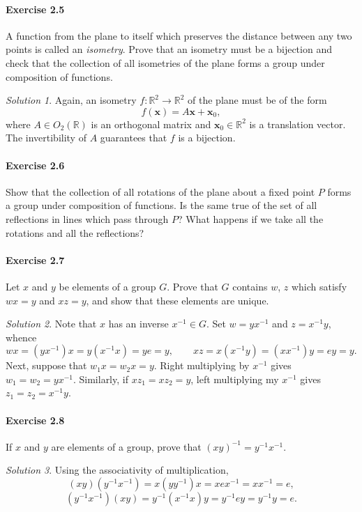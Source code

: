 \documentclass[11pt]{report}
\def\R{\mathbb{R}}
\renewcommand\vec\boldsymbol
\def\vx{\vec{x}}
\theoremstyle{remark}
\newtheorem*{solution}{Solution}
\begin{document}
    \paragraph{Exercise 2.5} A function from the plane to itself which preserves the
    distance between any two points is called an \textit{isometry}. Prove that an
    isometry must be a bijection and check that the collection of all isometries of
    the plane forms a group under composition of functions.
    \begin{solution}
        Again, an isometry $f\colon \R^2 \to \R^2$ of the plane must be of the form
        \[
            f(\vx) = A\vx + \vx_0,
        \] where $A \in O_2(\R)$ is an orthogonal matrix and $\vx_0 \in \R^2$ is a
        translation vector. The invertibility of $A$ guarantees that $f$ is a
        bijection.
    \end{solution}
    
    \paragraph{Exercise 2.6} Show that the collection of all rotations of the plane
    about a fixed point $P$ forms a group under composition of functions. Is the
    same true of the set of all reflections in lines which pass through $P$? What
    happens if we take all the rotations and all the reflections?

    \paragraph{Exercise 2.7} Let $x$ and $y$ be elements of a group $G$. Prove that
    $G$ contains $w$, $z$ which satisfy $wx = y$ and $xz = y$, and show that these
    elements are unique.
    \begin{solution}
        Note that $x$ has an inverse $x^{-1} \in G$. Set $w = yx^{-1}$ and $z =
        x^{-1}y$, whence \[
            wx = (yx^{-1})x = y(x^{-1}x) = ye = y, \qquad
            xz = x(x^{-1}y) = (xx^{-1})y = ey = y.
        \] Next, suppose that $w_1x = w_2x = y$. Right multiplying by $x^{-1}$ gives
        $w_1 = w_2 = yx^{-1}$. Similarly, if $xz_1 = xz_2 = y$, left multiplying my
        $x^{-1}$ gives $z_1 = z_2 = x^{-1}y$.
    \end{solution}

    \paragraph{Exercise 2.8} If $x$ and $y$ are elements of a group, prove that
    $(xy)^{-1} = y^{-1}x^{-1}$.
    \begin{solution}
        Using the associativity of multiplication, \[
            (xy)(y^{-1}x^{-1}) = x(yy^{-1})x = xex^{-1} = x x^{-1} = e,
        \]\[
            (y^{-1}x^{-1})(xy) = y^{-1}(x^{-1}x)y = y^{-1}ey = y^{-1}y = e.
        \] 
    \end{solution}
\end{document}

